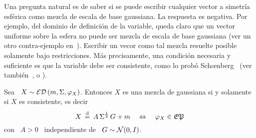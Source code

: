 Una  pregunta natural  es  de saber  si  se puede  escribir  cualquier vector  a
simetr\'ia esf\'erica como mezcla de  escala de base gaussiana.  La respuesta es
negativa. Por ejemplo,  del dominio de definici\'on de  la variable, queda claro
que un  vector uniforme sobre la  esfera no puede  ser mezcla de escala  de base
gaussiana (ver un otro  contra-ejemplo en~\cite{Pic70}).  Escribir un vecor como
tal mezcla  resuelte posible solamente bajo  restricciones.  M\'as precisamente,
una condici\'on necesaria y suficiente  es que la variable debe ser consistente,
como       lo        prob\'o       Sch{\oe}nberg~\cite[Teo.~2]{Sch38}       (ver
tambi\'en~\cite[Teo.~2]{SteVan05},            \cite[Lem.~2.2]{Yao73}           o
\cite[Teo.~1]{Kan94}).
%
\begin{teorema}
\label{Teo:MP:SchoenbergCaracteristica}
%
  Sea \ $X \sim  \mathcal{ED}\left( m , \Sigma , \varphi_X \right)$.  Entonces $X$ es una
  mezcla de  gaussiana si y  solamente si $X$  es consistente, es decir
  \[
  X \,  \stackrel{\mathrm{d}}{=} \,  A \, \Sigma^{\frac12}  \, G  + m \quad  \Leftrightarrow \quad
  \varphi_X \in \mathfrak{EP}
  \]
  con \ $A > 0$ \ independiente de \ $G \sim \mathcal{N}(0,I)$.
\end{teorema}
%
